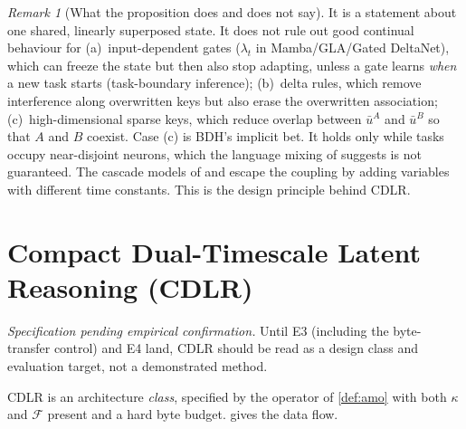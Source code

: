 \documentclass[11pt]{article}
\theoremstyle{remark}
\newtheorem{remark}{Remark}
\newcommand{\cdlr}{\textsc{CDLR}}
\begin{document}
\begin{remark}[What the proposition does and does not say]
It is a statement about one shared, linearly superposed state. It does not rule out good continual behaviour for
(a)~input-dependent gates ($\lambda_t$ in Mamba/GLA/Gated DeltaNet), which can freeze the state but then also stop
adapting, unless a gate learns \emph{when} a new task starts (task-boundary inference); (b)~delta rules, which
remove interference along overwritten keys but also erase the overwritten association; (c)~high-dimensional sparse
keys, which reduce overlap between $\bar u^A$ and $\bar u^B$ so that $A$ and $B$ coexist. Case (c) is BDH's
implicit bet. It holds only while tasks occupy near-disjoint neurons, which the language mixing of
\citet[\S7.1]{kosowski2025bdh} suggests is not guaranteed. The cascade models of \citet{fusi2005cascade} and
\citet{benna2016consolidation} escape the coupling by adding variables with different time constants. This is the
design principle behind \cdlr.
\end{remark}

\section{Compact Dual-Timescale Latent Reasoning (\cdlr)}

\noindent\textit{Specification pending empirical confirmation.}
Until E3 (including the byte-transfer control) and E4 land, \cdlr{} should be read as a design class and evaluation target, not a demonstrated method.
\label{sec:method}

\cdlr{} is an architecture \emph{class}, specified by the operator of \cref{def:amo} with both $\kappa$ and
$\mathcal{F}$ present and a hard byte budget.  gives the data flow.
\end{document}
